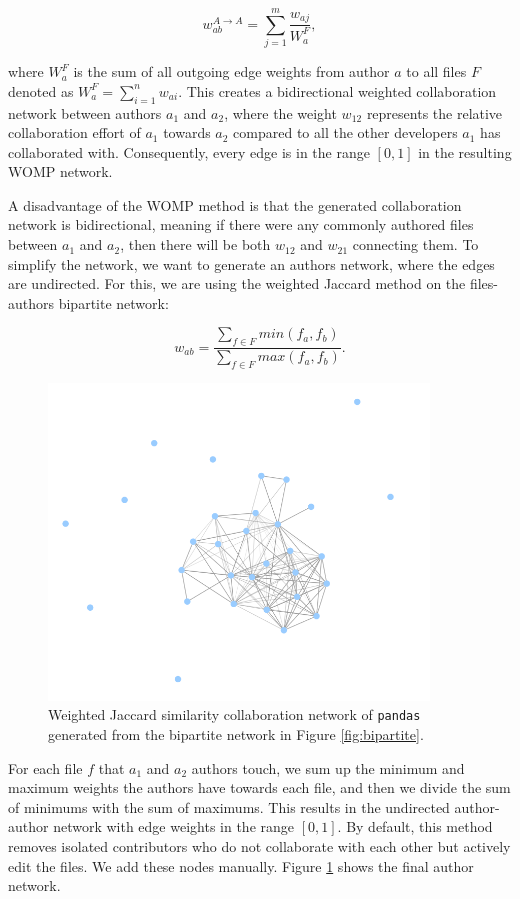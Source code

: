 \[ w_{ab}^{A \rightarrow A} = \sum_{j=1}^m \frac{w_{aj}}{W_a^F}, \]

where $W_a^F$ is the sum of all outgoing edge weights from author $a$ to all files $F$ denoted as $W_a^F = \sum_{i=1}^n w_{ai}$. This creates a bidirectional weighted collaboration network between authors $a_1$ and $a_2$, where the weight $w_{12}$ represents the relative collaboration effort of $a_1$ towards $a_2$ compared to all the other developers $a_1$ has collaborated with. Consequently, every edge is in the range $[0,1]$ in the resulting WOMP network.


A disadvantage of the WOMP method is that the generated collaboration network is bidirectional, meaning if there were any commonly authored files between $a_1$ and $a_2$, then there will be both $w_{12}$ and $w_{21}$ connecting them. To simplify the network, we want to generate an authors network, where the edges are undirected. For this, we are using the weighted Jaccard method on the files-authors bipartite network:

\[ w_{ab} = \frac{\sum_{f \in F}min(f_a, f_b)}{\sum_{f \in F}max(f_a, f_b)}. \]

\begin{figure}
    \centering
    \includegraphics[width=0.9\textwidth]{figures/jaccard.png}
    \caption{Weighted Jaccard similarity collaboration network of \texttt{pandas} generated from the bipartite network in Figure \ref{fig:bipartite}.}
    \label{fig:jaccard}
\end{figure}

For each file $f$ that $a_1$ and $a_2$ authors touch, we sum up the minimum and maximum weights the authors have towards each file, and then we divide the sum of minimums with the sum of maximums. This results in the undirected author-author network with edge weights in the range $[0, 1]$. By default, this method removes isolated contributors who do not collaborate with each other but actively edit the files. We add these nodes manually. Figure \ref{fig:jaccard} shows the final author network.


